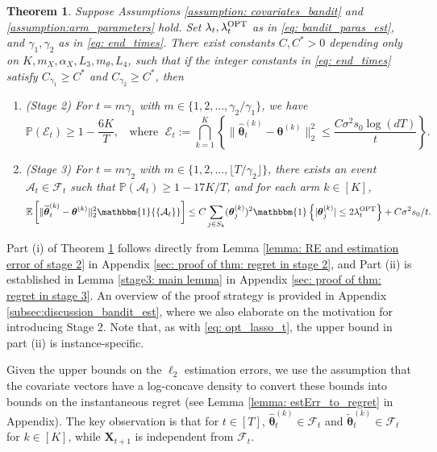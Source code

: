 \documentclass[aos,preprint]{imsart}
\theoremstyle{plain}
\newtheorem{theorem}{Theorem}
\theoremstyle{definition}
\newcommand{\btheta}{\boldsymbol{\theta}}
\newcommand{\hbtheta}{\widehat{\boldsymbol{\theta}}}
\newcommand{\idf}{\mathbbm{1}}
\newcommand{\bX}{\boldsymbol{X}}
\newcommand{\tbtheta}{\widetilde{\boldsymbol{\theta}}}
\newcommand{\hdlambda}{\lambda^{\textup{OPT}}}
\newcommand{\cF}{\mathcal{F}}
\newcommand{\Exp}{\mathbb{E}}
\newcommand{\Pro}{\mathbb{P}}
\begin{document}
\begin{theorem}\label{thm:bandit_est_accuracy}
 Suppose Assumptions \ref{assumption: covariates_bandit} and  \ref{assumption:arm_parameters} hold. Set $\lambda_t, \hdlambda_t$ as in \eqref{eq: bandit_paras_est}, and $\gamma_1,\gamma_2$ as in \eqref{eq: end_times}. 
 There exist constants $C,C^* > 0$ depending only on $K,  m_X, \alpha_X,  L_3, m_{\theta}, L_4$, such that
 if the integer constants in \eqref{eq: end_times} satisfy  $C_{\gamma_1} \geq C^*$ and $C_{\gamma_2} \geq C^*$, then
\begin{enumerate}[label=\roman*)]
\item (Stage 2) For $t = m\gamma_1$ with $m \in \{1,2, \ldots, \gamma_2/\gamma_1\}$, we have
$$
\Pro\left( \mathcal{E}_{t} \right) \geq 1- \frac{6K}{T}, \;\; \text{ where }\; \mathcal{E}_{t} := \bigcap_{k=1}^{K} \left\{\|\hbtheta_t^{(k)}-\btheta^{(k)}\|_2^2\le  \frac{C \sigma^2 s_0\log (dT)}{t}\right\}.
$$

\item (Stage 3) For $t = m\gamma_2$ with $m \in \{1,2,\ldots, \lfloor T/\gamma_2 \rfloor\}$, there exists an event $\mathcal{A}_t \in \cF_t$ such that $\Pro(\mathcal{A}_t)\ge 1-17K/T$, and for each arm $k \in [K]$,
\begin{equation*}
    \Exp\left[\|\tbtheta_t^{(k)}-\btheta^{(k)} \|_2^2 \idf{\{\mathcal{A}_t\}}\right] \le C\sum_{j\in S_k} (\btheta^{(k)}_j)^2 \idf\left\{|\btheta^{(k)}_j| \le 2\hdlambda_t \right\} + C\sigma^2 s_0/t.
\end{equation*}
\end{enumerate}   
\end{theorem}

Part (i) of Theorem \ref{thm:bandit_est_accuracy} follows directly from Lemma \ref{lemma: RE and estimation error of stage 2} in Appendix \ref{sec: proof of thm: regret in stage 2}, and Part (ii) is established in Lemma \ref{stage3: main lemma} in Appendix \ref{sec: proof of thm: regret in stage 3}. An overview of the proof strategy is provided in Appendix \ref{subsec:discussion_bandit_est}, where we also elaborate on the motivation for introducing Stage 2. Note that, as with \eqref{eq: opt_lasso_t}, the upper bound in part (ii) is instance-specific.



Given the upper bounds on the $\ell_2$ estimation errors, we use the assumption that the covariate vectors have a log-concave density to convert these bounds into bounds on the instantaneous regret (see Lemma \ref{lemma: estErr_to_regret} in Appendix). The key observation is that for  $t \in [T]$, $\hbtheta_t^{(k)} \in \cF_t$ and 
$\tbtheta_t^{(k)} \in \cF_t$ for $k \in [K]$, while $\bX_{t+1}$ is independent from $\cF_{t}$.
\end{document}
